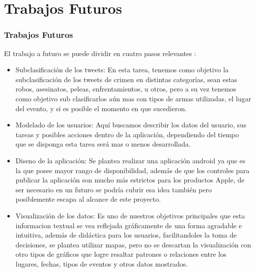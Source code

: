 \documentclass{beamer}
\begin{document}
\section{Trabajos Futuros}
\begin{frame}
\frametitle{Trabajos Futuros}
El trabajo a futuro se puede dividir en cuatro pasos relevantes : 
\begin{itemize}
\item Subclasificaci\'{o}n de los tweets:
  En esta tarea, tenemos como objetivo la subclasificaci\'{o}n de los tweets de crimen en distintas categor\'{i}as, sean estas robos, asesinatos, peleas, enfrentamientos, u otros, pero a su vez tenemos como objetivo sub clasificarlos aún mas con tipos de armas utilizadas, el lugar del evento, y si es posible el momento en que sucedieron. 
\item Modelado de los usuarios:
  Aqu\'{i} buscamos describir los datos del usuario, sus tareas y posibles acciones dentro de la aplicaci\'{o}n, dependiendo del tiempo que se disponga esta tarea ser\'{a} mas o menos desarrollada.
\end{itemize}
\end{frame}
\begin{frame}
\begin{itemize}
\item Diseno de la aplicaci\'{o}n:
  Se plantea realizar una aplicaci\'{o}n android ya que es la que posee mayor rango de disponibilidad, adem\'{a}s de que los controles para publicar la aplicaci\'{o}n son mucho m\'{a}s estrictos para los productos Apple, de ser necesario en un futuro se podr\'{i}a cubrir esa idea tambi\'{e}n pero posiblemente escapa al alcance de este proyecto.
\item Visualizaci\'{o}n de los datos: 
  Es uno de nuestros objetivos principales que esta informacion textual se vea reflejada gr\'{a}ficamente de una forma agradable e intuitiva, adem\'{a}s de did\'{a}ctica para los usuarios, facilitandoles la toma de decisiones, se plantea utilizar mapas, pero no se descartan la visualizaci\'{o}n con otro tipos de gr\'{a}ficos que logre resaltar patrones o relaciones entre los lugares, fechas, tipos de eventos y otros datos mostrados. 
\end{itemize}
\end{frame}
\end{document}
